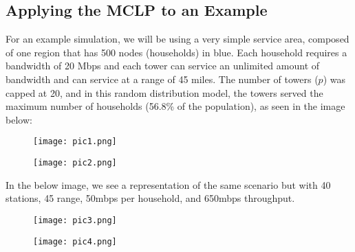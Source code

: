 	\subsection*{Applying the MCLP to an Example}
	For an example simulation, we will be using a very simple service area, composed of one region that has 500 nodes (households) in blue. Each household requires a bandwidth of 20 Mbps and each tower can service an unlimited amount of bandwidth and can service at a range of 45 miles. The number of towers ($p$) was capped at 20, and in this random distribution model, the towers served the maximum number of households (56.8\% of the population), as seen in the image below:

\renewcommand{\thefigure}{1}
    \begin{figure}[!htb]
   \begin{minipage}{0.48\textwidth}
     \centering
     \texttt{[image: pic1.png]}
     
   \end{minipage}\hfill
   \begin{minipage}{0.48\textwidth}
     \centering
     \texttt{[image: pic2.png]}
     
   \end{minipage}
\end{figure}
    
    
    In the below image, we see a representation of the same scenario but with 40 stations, 45 range, 50mbps per household, and 650mbps throughput.
    
    \renewcommand{\thefigure}{1}
    \begin{figure}[!htb]
   \begin{minipage}{0.48\textwidth}
     \centering
     \texttt{[image: pic3.png]}
     
   \end{minipage}\hfill
   \begin{minipage}{0.48\textwidth}
     \centering
     \texttt{[image: pic4.png]}
     
   \end{minipage}
\end{figure}
    

